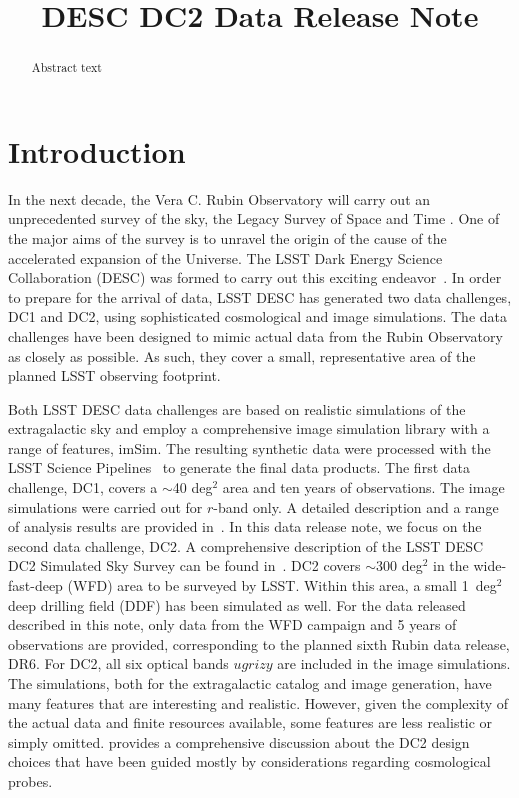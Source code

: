\documentclass[modern]{descnote}
\begin{document}
\title{DESC DC2 Data Release Note}


\begin{abstract}
%
Abstract text
%
\clearpage
\end{abstract}

\tableofcontents

\clearpage

\section{Introduction}

In the next decade, the Vera C. Rubin Observatory will carry out an unprecedented survey of the sky, the Legacy Survey of Space and Time \citep{2009arXiv0912.0201L}. One of the major aims of the survey is to unravel the origin of the cause of the accelerated expansion of the Universe. The LSST Dark Energy Science Collaboration (DESC) was formed to carry out this exciting endeavor~\citep{Abate:2012za}. In order to prepare for the arrival of data, LSST DESC has generated two data challenges, DC1 and DC2, using sophisticated cosmological and  image simulations. The data challenges have been designed to mimic actual data from the Rubin Observatory as closely as possible. As such, they cover a small, representative area of the planned LSST observing footprint. 

Both LSST DESC data challenges are based on realistic simulations of the extragalactic sky and employ a comprehensive image simulation library with a range of features, imSim. The resulting synthetic data were processed with the LSST Science Pipelines~\citep{2017ASPC..512..279J} to generate the final data products. The first data challenge, DC1, covers a $\sim$40 deg$^2$ area and ten years of observations. The image simulations were carried out for $r$-band only. A detailed description and a range of analysis results are provided in~\cite{dc1}.  In this data release note, we focus on the second data challenge, DC2. A comprehensive description of the LSST DESC DC2 Simulated Sky Survey can be found in~\cite{2020arXiv201005926L}. DC2 covers $\sim$300 deg$^2$ in the wide-fast-deep (WFD) area to be surveyed by LSST. Within this area, a small 1~deg$^2$ deep drilling field (DDF) has been simulated as well. For the data released described in this note, only data from the WFD campaign and 5 years of observations are provided, corresponding to the planned sixth Rubin data release, DR6. For DC2, all six optical bands $ugrizy$ are included in the image simulations. The simulations, both for the extragalactic catalog and image generation, have many features that are interesting and realistic. However, given the complexity of the actual data and finite resources available, some features are less realistic or simply omitted. \cite{2020arXiv201005926L} provides a comprehensive discussion about the DC2 design choices that have been guided mostly by considerations regarding cosmological probes.  
\end{document}

